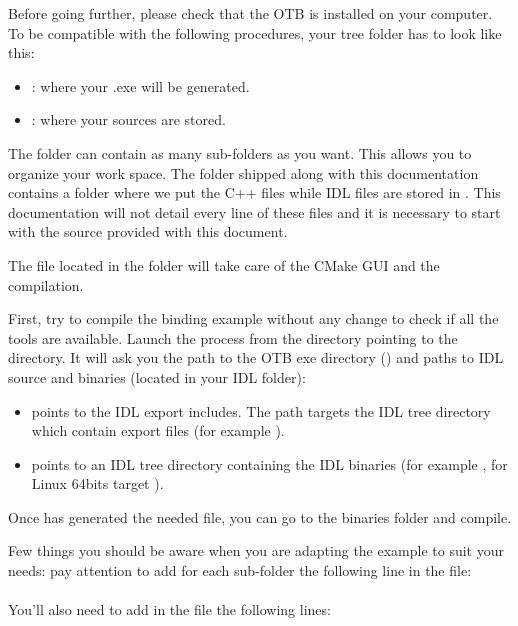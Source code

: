 Before going further, please check that the OTB is installed on your computer.
To be compatible with the following procedures, your tree folder has to look like this:
\begin{itemize}
\item {}: where your .exe will be generated.
\item {}: where your sources are stored.
\end{itemize}

The  folder can contain as many sub-folders as you want. This allows you to organize your work space. The  folder shipped along with this 
documentation contains a  folder where we put the C++ files while IDL files are stored in . This documentation will not detail every line of these files and it is necessary to start with the source provided with this document.

The  file located in the  folder will take care of the CMake GUI and the compilation.

First, try to compile the binding example without any change to check
if all the tools are available. Launch the  process from the  directory pointing to the  directory. It will ask you the path to the OTB exe directory 
() and paths to IDL source and binaries (located in your IDL folder):

\begin{itemize}
\item {} points to the IDL export includes. The path targets the IDL tree directory which contain export files (for example ).
\item {} points to an IDL tree directory containing the IDL binaries (for example , for Linux 64bits target ).
\end{itemize}

Once  has generated the needed file, you can go to the binaries folder and compile.

Few things you should be aware when you are adapting the example to suit your needs: pay attention to add for each sub-folder the following line in the  file:\\
\\
You'll also need to add in the  file the following lines:
\\
\\


